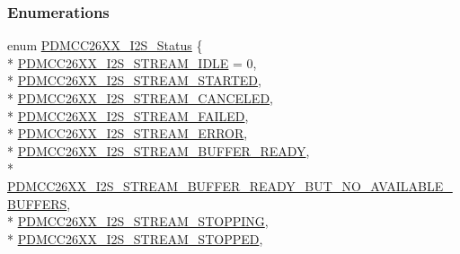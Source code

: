\subsubsection*{Enumerations}
\begin{DoxyCompactItemize}
\item 
enum \hyperlink{_p_d_m_c_c26_x_x__util_8h_ac1e4fbeb33409a874015d4e0609ddff1}{P\+D\+M\+C\+C26\+X\+X\+\_\+\+I2\+S\+\_\+\+Status} \{ \\*
\hyperlink{_p_d_m_c_c26_x_x__util_8h_ac1e4fbeb33409a874015d4e0609ddff1a16df5a8f67d12b81d307af221d46ab18}{P\+D\+M\+C\+C26\+X\+X\+\_\+\+I2\+S\+\_\+\+S\+T\+R\+E\+A\+M\+\_\+\+I\+D\+L\+E} = 0, 
\\*
\hyperlink{_p_d_m_c_c26_x_x__util_8h_ac1e4fbeb33409a874015d4e0609ddff1a4a32be3e7f98c0bacfb55142e1d4cf89}{P\+D\+M\+C\+C26\+X\+X\+\_\+\+I2\+S\+\_\+\+S\+T\+R\+E\+A\+M\+\_\+\+S\+T\+A\+R\+T\+E\+D}, 
\\*
\hyperlink{_p_d_m_c_c26_x_x__util_8h_ac1e4fbeb33409a874015d4e0609ddff1a8284b284a95225ef6919d51336364ce6}{P\+D\+M\+C\+C26\+X\+X\+\_\+\+I2\+S\+\_\+\+S\+T\+R\+E\+A\+M\+\_\+\+C\+A\+N\+C\+E\+L\+E\+D}, 
\\*
\hyperlink{_p_d_m_c_c26_x_x__util_8h_ac1e4fbeb33409a874015d4e0609ddff1a1f07b976c3da69bb99bd89be2ce4d894}{P\+D\+M\+C\+C26\+X\+X\+\_\+\+I2\+S\+\_\+\+S\+T\+R\+E\+A\+M\+\_\+\+F\+A\+I\+L\+E\+D}, 
\\*
\hyperlink{_p_d_m_c_c26_x_x__util_8h_ac1e4fbeb33409a874015d4e0609ddff1a2927dbcaeefc4cd9fc49b2d51767fda0}{P\+D\+M\+C\+C26\+X\+X\+\_\+\+I2\+S\+\_\+\+S\+T\+R\+E\+A\+M\+\_\+\+E\+R\+R\+O\+R}, 
\\*
\hyperlink{_p_d_m_c_c26_x_x__util_8h_ac1e4fbeb33409a874015d4e0609ddff1a9b0c4bf2229c25d6f271bc8e5d8f6f57}{P\+D\+M\+C\+C26\+X\+X\+\_\+\+I2\+S\+\_\+\+S\+T\+R\+E\+A\+M\+\_\+\+B\+U\+F\+F\+E\+R\+\_\+\+R\+E\+A\+D\+Y}, 
\\*
\hyperlink{_p_d_m_c_c26_x_x__util_8h_ac1e4fbeb33409a874015d4e0609ddff1a6dac68bba81485d36db74d4427de22de}{P\+D\+M\+C\+C26\+X\+X\+\_\+\+I2\+S\+\_\+\+S\+T\+R\+E\+A\+M\+\_\+\+B\+U\+F\+F\+E\+R\+\_\+\+R\+E\+A\+D\+Y\+\_\+\+B\+U\+T\+\_\+\+N\+O\+\_\+\+A\+V\+A\+I\+L\+A\+B\+L\+E\+\_\+\+B\+U\+F\+F\+E\+R\+S}, 
\\*
\hyperlink{_p_d_m_c_c26_x_x__util_8h_ac1e4fbeb33409a874015d4e0609ddff1aac07f8085e63f0883863ad9ec092b6ce}{P\+D\+M\+C\+C26\+X\+X\+\_\+\+I2\+S\+\_\+\+S\+T\+R\+E\+A\+M\+\_\+\+S\+T\+O\+P\+P\+I\+N\+G}, 
\\*
\hyperlink{_p_d_m_c_c26_x_x__util_8h_ac1e4fbeb33409a874015d4e0609ddff1a0c245201c506bf7eacfb9f0f451e33dd}{P\+D\+M\+C\+C26\+X\+X\+\_\+\+I2\+S\+\_\+\+S\+T\+R\+E\+A\+M\+\_\+\+S\+T\+O\+P\+P\+E\+D}, 

\end{DoxyCompactItemize}
